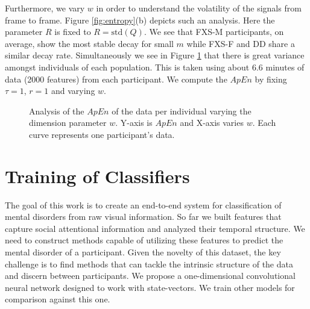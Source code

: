 \documentclass[10pt,twocolumn,letterpaper]{article}
\begin{document}
Furthermore, we vary $w$ in order to understand the volatility of the signals from frame to frame. Figure \ref{fig:entropy}(b) depicts such an analysis. Here the parameter $R$ is fixed to $R=\text{std}(Q)$. We see that FXS-M participants, on average, show the most stable decay for small $m$ while FXS-F and DD share a similar decay rate. Simultaneously we see in Figure \ref{fig:individual_entropy} that there is great variance amongst individuals of each population. This is taken using about 6.6 minutes of data (2000 features) from each participant. We compute the $ApEn$ by fixing $\tau=1$, $r=1$ and varying $w$. 
\begin{figure}[b]
        \centering
            \hfill
             \hfill
         \centering
        \caption{Analysis of the $ApEn$ of the data per individual varying the dimension parameter $w$. Y-axis is $ApEn$ and X-axis varies $w$. Each curve represents one participant's data.}
        \label{fig:individual_entropy}
\end{figure}


\section{Training of Classifiers}
\label{sec:classification}

The goal of this work is to create an end-to-end system for classification of mental disorders from raw visual information. So far we built features that capture social attentional information and analyzed their temporal structure. We need to construct methods capable of utilizing these features to predict the mental disorder of a participant. Given the novelty of this dataset, the key challenge is to find methods that can tackle the intrinsic structure of the data and discern between participants. We propose a one-dimensional convolutional neural network designed to work with state-vectors. We train other models for comparison against this one.
\end{document}
